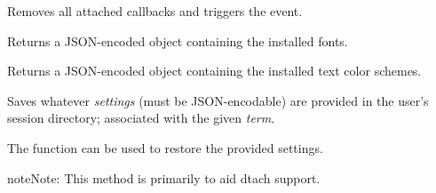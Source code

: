 \documentclass[letterpaper,10pt,openany]{sphinxmanual}
\begin{document}
\begin{fulllineitems}
\begin{fulllineitems}
\end{fulllineitems}


\begin{fulllineitems}
\label{Applications/terminal/app_terminal:app_terminal.TerminalApplication.on_close}
Removes all attached callbacks and triggers the 
event.

\end{fulllineitems}


\begin{fulllineitems}
\label{Applications/terminal/app_terminal:app_terminal.TerminalApplication.enumerate_fonts}
Returns a JSON-encoded object containing the installed fonts.

\end{fulllineitems}


\begin{fulllineitems}
\label{Applications/terminal/app_terminal:app_terminal.TerminalApplication.enumerate_colors}
Returns a JSON-encoded object containing the installed text color
schemes.

\end{fulllineitems}


\begin{fulllineitems}
\label{Applications/terminal/app_terminal:app_terminal.TerminalApplication.save_term_settings}
Saves whatever \emph{settings} (must be JSON-encodable) are provided in the
user's session directory; associated with the given \emph{term}.

The {\hyperref[Applications/terminal/app_terminal:app_terminal.TerminalApplication.restore_term_settings]{}} function can be used to restore the provided
settings.

\begin{notice}{note}{Note:}
This method is primarily to aid dtach support.
\end{notice}


\end{fulllineitems}
\end{fulllineitems}
\end{document}
